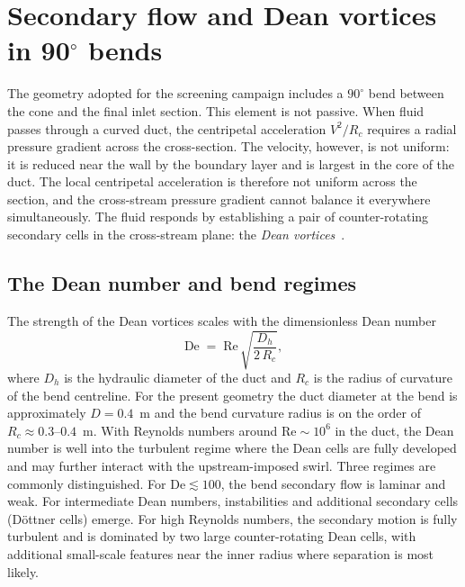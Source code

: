 \section{Secondary flow and Dean vortices in 90$^\circ$ bends}
\label{sec:theory_dean_bend}
 
The geometry adopted for the screening campaign includes a $90^\circ$ bend between the cone and the final inlet section. This element is not passive. When fluid passes through a curved duct, the centripetal acceleration $V^2/R_c$ requires a radial pressure gradient across the cross-section. The velocity, however, is not uniform: it is reduced near the wall by the boundary layer and is largest in the core of the duct. The local centripetal acceleration is therefore not uniform across the section, and the cross-stream pressure gradient cannot balance it everywhere simultaneously. The fluid responds by establishing a pair of counter-rotating secondary cells in the cross-stream plane: the \emph{Dean vortices}~\cite{Dean1927}.
 
\subsection{The Dean number and bend regimes}
\label{sec:theory_dean_number}
 
The strength of the Dean vortices scales with the dimensionless Dean number
\begin{equation}
\mathrm{De} \;=\; \mathrm{Re}\,\sqrt{\frac{D_h}{2\,R_c}},
\label{eq:dean}
\end{equation}
where $D_h$ is the hydraulic diameter of the duct and $R_c$ is the radius of curvature of the bend centreline. For the present geometry the duct diameter at the bend is approximately $D = 0.4$~m and the bend curvature radius is on the order of $R_c \approx 0.3$--$0.4$~m. With Reynolds numbers around $\mathrm{Re} \sim 10^6$ in the duct, the Dean number is well into the turbulent regime where the Dean cells are fully developed and may further interact with the upstream-imposed swirl. Three regimes are commonly distinguished. For $\mathrm{De} \lesssim 100$, the bend secondary flow is laminar and weak. For intermediate Dean numbers, instabilities and additional secondary cells (D\"ottner cells) emerge. For high Reynolds numbers, the secondary motion is fully turbulent and is dominated by two large counter-rotating Dean cells, with additional small-scale features near the inner radius where separation is most likely.
 
